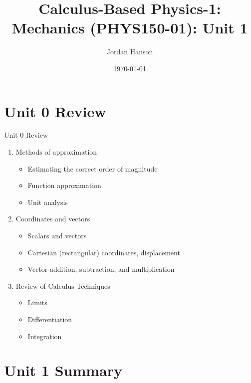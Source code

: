 \documentclass{beamer}
\title{Calculus-Based Physics-1: Mechanics (PHYS150-01): Unit 1}
\date{\today}
\author{Jordan Hanson}
\institute{Whittier College Department of Physics and Astronomy}
\begin{document}
\maketitle

\section{Unit 0 Review}

\begin{frame}{Unit 0 Review}
\begin{enumerate}
\item Methods of approximation
\begin{itemize}
\item \alert{Estimating} the correct order of magnitude
\item \alert{Function} approximation
\item \alert{Unit analysis}
\end{itemize}
\item Coordinates and vectors
\begin{itemize}
\item \alert{Scalars} and \alert{vectors}
\item \alert{Cartesian} (rectangular) coordinates, displacement
\item \alert{Vector} addition, subtraction, and multiplication
\end{itemize}
\item Review of Calculus Techniques
\begin{itemize}
\item Limits
\item Differentiation
\item Integration
\end{itemize}
\end{enumerate}
\end{frame}

\section{Unit 1 Summary}
\end{document}
